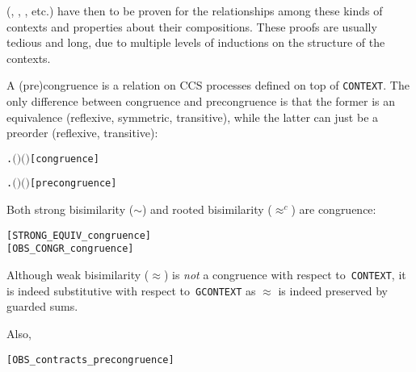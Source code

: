  (, ,
, etc.) have then to be proven for the
 relationships among these kinds of contexts and properties about their
 compositions. These proofs are usually tedious and long,  due to multiple levels of
 inductions on the structure of the contexts.

A (pre)congruence is a relation on CCS processes defined on top of
\texttt{CONTEXT}. The only difference between congruence and
precongruence is that the former  is an equivalence (reflexive,
symmetric, transitive), while the latter can  just be  a preorder (reflexive, transitive):
\begin{alltt}
  \HOLSymConst{\HOLTokenDefEquality{}}
    \HOLSymConst{\HOLTokenConj{}} \HOLSymConst{\HOLTokenForall{}}  .   \HOLSymConst{\HOLTokenImp{}}    \HOLSymConst{\HOLTokenImp{}}  \ensuremath{(} \ensuremath{)} \ensuremath{(} \ensuremath{)}\hfill{[congruence]}

  \HOLSymConst{\HOLTokenDefEquality{}}
    \HOLSymConst{\HOLTokenConj{}} \HOLSymConst{\HOLTokenForall{}}  .   \HOLSymConst{\HOLTokenImp{}}    \HOLSymConst{\HOLTokenImp{}}  \ensuremath{(} \ensuremath{)} \ensuremath{(} \ensuremath{)}\hfill{[precongruence]}
\end{alltt}

Both strong bisimilarity ($\sim$) and
rooted bisimilarity ($\approx^c$) are congruence:
\begin{alltt}
\HOLTokenTurnstile{}  \hfill{[STRONG_EQUIV_congruence]}
\HOLTokenTurnstile{}  \hfill{[OBS_CONGR_congruence]}
\end{alltt}

Although weak bisimilarity ($\approx$) is \emph{not} a congruence
  with respect to~\texttt{CONTEXT}, it is indeed substitutive
  with respect to~\texttt{GCONTEXT} 
as $\approx$ is indeed preserved by guarded sums.

Also,
\begin{alltt}
\HOLTokenTurnstile{}  \hfill{[OBS_contracts_precongruence]}
\end{alltt}

  